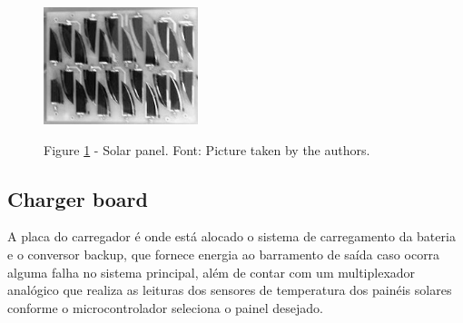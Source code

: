 \documentclass[final,3p,times,twocolumn,authoryear]{elsarticle}
\begin{document}
	\begin{figure}[th]
		\label{cells}
		\centering
		\includegraphics[width=0.9\linewidth]{./figs/cells}
			
		\begin{small}
		Figure \ref{cells} - Solar panel. Font: Picture taken by the authors.
		\end{small}		
	\end{figure}
	\pagebreak
	
\subsection{Charger board}
\label{Charger board}

A placa do carregador é onde está alocado o sistema de carregamento da bateria e o conversor backup, que fornece energia
ao barramento de saída caso ocorra alguma falha no sistema principal, além de contar com um multiplexador analógico que realiza as leituras dos sensores de temperatura dos painéis solares conforme o microcontrolador seleciona o painel desejado.
\end{document}

